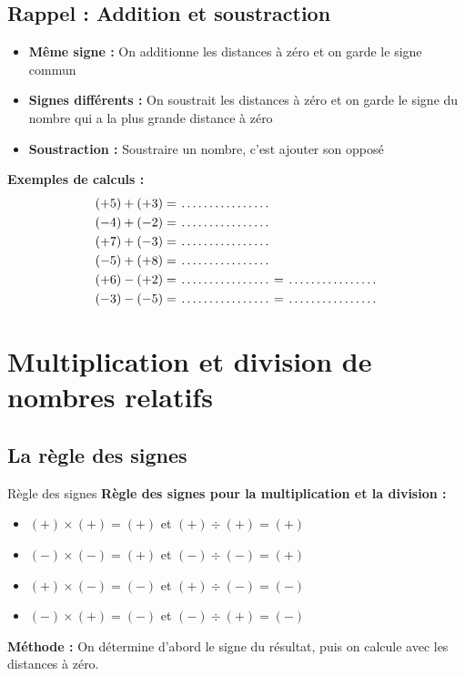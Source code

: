 \subsection{Rappel : Addition et soustraction}

\begin{proprietebox}
\begin{itemize}[label = \textbullet]
\item \textbf{Même signe :} On additionne les distances à zéro et on garde le signe commun
\item \textbf{Signes différents :} On soustrait les distances à zéro et on garde le signe du nombre qui a la plus grande distance à zéro
\item \textbf{Soustraction :} Soustraire un nombre, c'est ajouter son opposé
\end{itemize}
\end{proprietebox}

\begin{examplebox}
\textbf{Exemples de calculs :}
\begin{align*}
(+5) + (+3) &= \trous{2.5cm} \\
(-4) + (-2) &= \trous{2.5cm} \\
(+7) + (-3) &= \trous{2.5cm} \\
(-5) + (+8) &= \trous{2.5cm} \\
(+6) - (+2) &= \trous{2.5cm} = \trous{2.5cm} \\
(-3) - (-5) &= \trous{2.5cm} = \trous{2.5cm}
\end{align*}
\end{examplebox}

\section{Multiplication et division de nombres relatifs}

\subsection{La règle des signes}

\begin{proprietebox}{Règle des signes}
\textbf{Règle des signes pour la multiplication et la division :}
\begin{itemize}[label = \textbullet]
\item $(+) \times (+) = (+)$ \quad et \quad $(+) \div (+) = (+)$
\item $(-) \times (-) = (+)$ \quad et \quad $(-) \div (-) = (+)$
\item $(+) \times (-) = (-)$ \quad et \quad $(+) \div (-) = (-)$
\item $(-) \times (+) = (-)$ \quad et \quad $(-) \div (+) = (-)$
\end{itemize}

\textbf{Méthode :} On détermine d'abord le signe du résultat, puis on calcule avec les distances à zéro.
\end{proprietebox}


